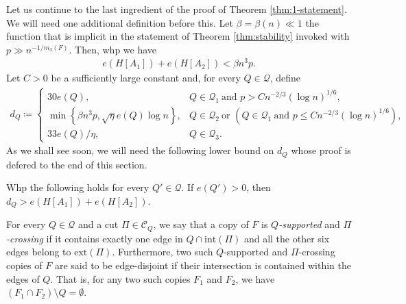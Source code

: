 \documentclass[11pt,a4paper,oneside,reqno]{amsart}
\newcommand{\cC}{\mathcal{C}}
\newcommand{\cQ}{\mathcal{Q}}
\newcommand{\1}{\mathbbm{1}} %
\renewcommand{\le}{\leqslant}
\newcommand{\ext}{\mathrm{ext}}
\renewcommand{\int}{\mathrm{int}}
\begin{document}
Let us continue to the last ingredient of the proof of Theorem \ref{thm:1-statement}. We will need one additional definition before this.
Let $\beta = \beta(n) \ll 1$ the function that is implicit in the statement of Theorem \ref{thm:stability} invoked with $p \gg n^{-1/m_3(F)}$. Then, whp we have 
\begin{align}\label{align:bound on int Pi_H}
    e(H[A_1]) + e(H[A_2]) < \beta n^3 p.
\end{align}
Let $C > 0$ be a sufficiently large constant and, for every $Q \in \cQ$, define
\begin{align}\label{align:d_Q-def}
    d_Q \coloneqq \begin{cases}
        30 e(Q), &Q \in \cQ_1\ \text{and } p > C n^{-2/3} \left(\log n\right)^{1/6}, \\
        \min\left\{\beta n^3 p, \sqrt{\eta} e(Q) \log n\right\}, &Q \in \cQ_2\ \text{or } \left(Q \in \cQ_1\ \text{and }p \le C n^{-2/3} \left(\log n\right)^{1/6}\right), \\
        33 e(Q) / \eta, &Q \in \cQ_3.
    \end{cases}
\end{align}
As we shall see soon, we will need the following lower bound on $d_Q$ whose proof is defered to the end of this section.
\begin{claim}\label{claim:d_Q bound}
    Whp the following holds for every $Q' \in \cQ$. If $e(Q') > 0$, then $d_Q > e(H[A_1]) + e(H[A_2])$.
\end{claim}

For every $Q \in \cQ$ and a cut $\Pi \in \cC_Q$, we say that a copy of $F$ is \textit{$Q$-supported} and \textit{$\Pi$-crossing} if it contains exactly one edge in $Q \cap \int(\Pi)$ and all the other six edges belong to $\ext(\Pi)$. Furthermore,  two such $Q$-supported and $\Pi$-crossing copies of $F$ are said to be edge-disjoint if their intersection is contained within the edges of $Q$. That is, for any two such copies $F_1$ and $F_2$, we have $(F_1 \cap F_2) \setminus Q = \emptyset$.
\end{document}
